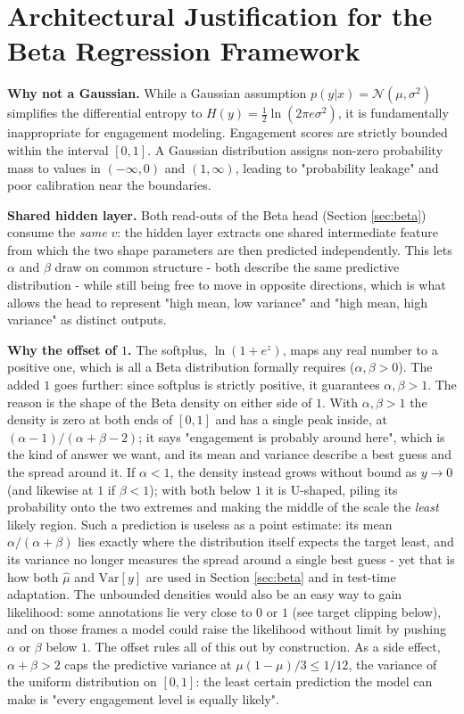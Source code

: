 \documentclass[10pt,a4paper,twocolumn]{article}
\begin{document}
	\section{Architectural Justification for the Beta Regression Framework}
	\label{app:betajust}
	\textbf{Why not a Gaussian.} While a Gaussian assumption $p(y|x) = \mathcal{N}(\mu, \sigma^2)$ simplifies the differential entropy to $H(y) = \frac{1}{2}\ln(2\pi e \sigma^2)$, it is fundamentally inappropriate for engagement modeling. Engagement scores are strictly bounded within the interval $[0, 1]$. A Gaussian distribution assigns non-zero probability mass to values in $(-\infty, 0)$ and $(1, \infty)$, leading to "probability leakage" and poor calibration near the boundaries.

	\textbf{Shared hidden layer.} Both read-outs of the Beta head (Section \ref{sec:beta}) consume the \emph{same} $v$: the hidden layer extracts one shared intermediate feature from which the two shape parameters are then predicted independently. This lets $\alpha$ and $\beta$ draw on common structure - both describe the same predictive distribution - while still being free to move in opposite directions, which is what allows the head to represent "high mean, low variance" and "high mean, high variance" as distinct outputs.

	\textbf{Why the offset of $1$.} The softplus, $\ln(1+e^{z})$, maps any real number to a positive one, which is all a Beta distribution formally requires ($\alpha, \beta > 0$). The added $1$ goes further: since softplus is strictly positive, it guarantees $\alpha, \beta > 1$. The reason is the shape of the Beta density on either side of $1$. With $\alpha, \beta > 1$ the density is zero at both ends of $[0,1]$ and has a single peak inside, at $(\alpha-1)/(\alpha+\beta-2)$; it says "engagement is probably around here", which is the kind of answer we want, and its mean and variance describe a best guess and the spread around it. If $\alpha < 1$, the density instead grows without bound as $y \to 0$ (and likewise at $1$ if $\beta < 1$); with both below $1$ it is U-shaped, piling its probability onto the two extremes and making the middle of the scale the \emph{least} likely region. Such a prediction is useless as a point estimate: its mean $\alpha/(\alpha+\beta)$ lies exactly where the distribution itself expects the target least, and its variance no longer measures the spread around a single best guess - yet that is how both $\hat{\mu}$ and $\mathrm{Var}[y]$ are used in Section \ref{sec:beta} and in test-time adaptation. The unbounded densities would also be an easy way to gain likelihood: some annotations lie very close to $0$ or $1$ (see target clipping below), and on those frames a model could raise the likelihood without limit by pushing $\alpha$ or $\beta$ below $1$. The offset rules all of this out by construction. As a side effect, $\alpha + \beta > 2$ caps the predictive variance at $\mu(1-\mu)/3 \le 1/12$, the variance of the uniform distribution on $[0,1]$: the least certain prediction the model can make is "every engagement level is equally likely".
\end{document}
